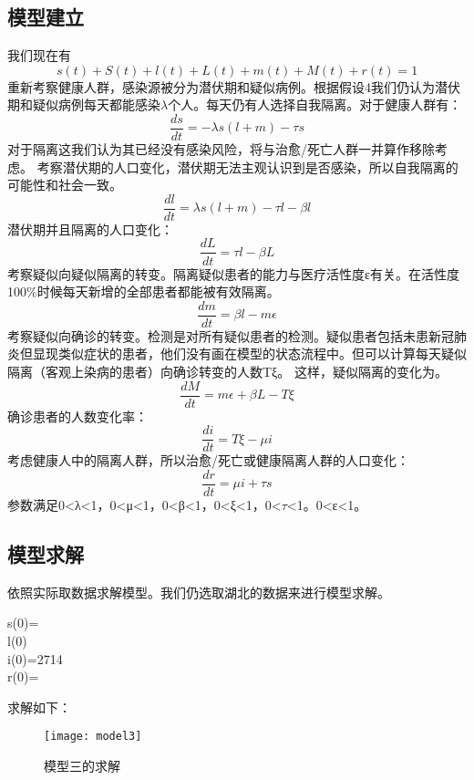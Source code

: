 \documentclass[withoutpreface,bwprint]{cumcmthesis} %
\begin{document}
\subsection{模型建立}
我们现在有
    \begin{equation}\label{qua:015}
        s(t)+S(t)+l(t)+L(t)+m(t)+M(t)+r(t)=1
    \end{equation}
重新考察健康人群，感染源被分为潜伏期和疑似病例。根据假设4我们仍认为潜伏期和疑似病例每天都能感染$\lambda $个人。每天仍有人选择自我隔离。对于健康人群有：
    \begin{equation}\label{qua:016}
        \frac{ds}{dt}=-\lambda s(l+m)-\tau s
    \end{equation}
对于隔离这我们认为其已经没有感染风险，将与治愈/死亡人群一并算作移除考虑。
考察潜伏期的人口变化，潜伏期无法主观认识到是否感染，所以自我隔离的可能性和社会一致。
    \begin{equation}\label{qua:017}
        \frac{dl}{dt}=\lambda s(l+m)-\tau l-\beta l
    \end{equation}
潜伏期并且隔离的人口变化：
    \begin{equation}\label{qua:018}
    \frac{dL}{dt}=\tau l-\beta L
    \end{equation}
考察疑似向疑似隔离的转变。隔离疑似患者的能力与医疗活性度ε有关。在活性度100\%时候每天新增的全部患者都能被有效隔离。
    \begin{equation}\label{qua:019}
    \frac{dm}{dt}=\beta l-m\epsilon
    \end{equation}
考察疑似向确诊的转变。检测是对所有疑似患者的检测。疑似患者包括未患新冠肺炎但显现类似症状的患者，他们没有画在模型的状态流程中。但可以计算每天疑似隔离（客观上染病的患者）向确诊转变的人数Tξ。
这样，疑似隔离的变化为。
    \begin{equation}\label{qua:020}
    \frac{dM}{dt}=m\epsilon+\beta L-T\xi
    \end{equation}
确诊患者的人数变化率：
    \begin{equation}\label{qua:021}
    \frac{di}{dt}=T\xi-\mu i
    \end{equation}
考虑健康人中的隔离人群，所以治愈/死亡或健康隔离人群的人口变化：
    \begin{equation}\label{qua:022}
    \frac{dr}{dt}=\mu i+\tau s
    \end{equation}
参数满足0<λ<1，0<μ<1，0<β<1，0<ξ<1，0<$\tau$<1。0<ε<1。

\subsection{模型求解}
依照实际取数据求解模型。我们仍选取湖北的数据来进行模型求解。
\begin{center}
s(0)=\\l(0)\\i(0)=2714\\r(0)=
\end{center}
求解如下：
    \begin{figure}[!h]
        \centering
        \texttt{[image: model3]}
        \caption{模型三的求解}
        \label{fig:ana2_flow}
    \end{figure}
\end{document}
